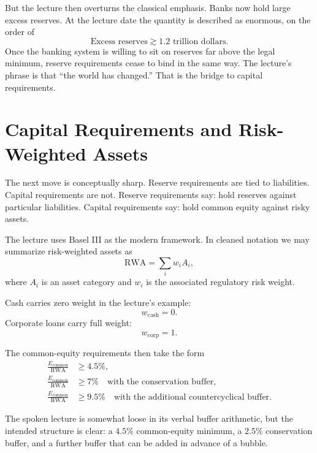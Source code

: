But the lecture then overturns the classical emphasis. Banks now hold large excess reserves. At the lecture date the quantity is described as enormous, on the order of
\begin{equation}
\text{Excess reserves} \gtrsim 1.2 \text{ trillion dollars}.
\end{equation}
Once the banking system is willing to sit on reserves far above the legal minimum, reserve requirements cease to bind in the same way. The lecture's phrase is that ``the world has changed.'' That is the bridge to capital requirements.

\section{Capital Requirements and Risk-Weighted Assets}

The next move is conceptually sharp. Reserve requirements are tied to liabilities. Capital requirements are not. Reserve requirements say: hold reserves against particular liabilities. Capital requirements say: hold common equity against risky assets.

The lecture uses Basel III as the modern framework. In cleaned notation we may summarize risk-weighted assets as
\begin{equation}
\text{RWA} = \sum_i w_i A_i,
\end{equation}
where \(A_i\) is an asset category and \(w_i\) is the associated regulatory risk weight.

Cash carries zero weight in the lecture's example:
\begin{equation}
w_{\text{cash}} = 0.
\end{equation}
Corporate loans carry full weight:
\begin{equation}
w_{\text{corp}} = 1.
\end{equation}

The common-equity requirements then take the form
\begin{align}
\frac{E_{\text{common}}}{\text{RWA}} &\ge 4.5\%, \\
\frac{E_{\text{common}}}{\text{RWA}} &\ge 7\% \quad \text{with the conservation buffer}, \\
\frac{E_{\text{common}}}{\text{RWA}} &\ge 9.5\% \quad \text{with the additional countercyclical buffer.}
\end{align}

\begin{remark}
The spoken lecture is somewhat loose in its verbal buffer arithmetic, but the intended structure is clear: a \(4.5\%\) common-equity minimum, a \(2.5\%\) conservation buffer, and a further buffer that can be added in advance of a bubble.
\end{remark}

